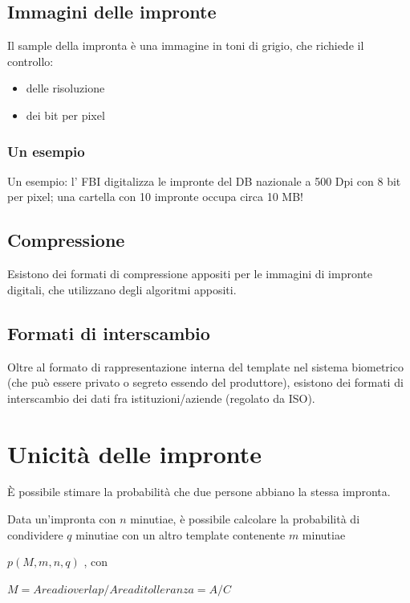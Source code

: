 \documentclass{report}
\begin{document}
\subsection{Immagini delle impronte}
Il sample della impronta è una immagine in toni
di grigio, che richiede il controllo:
\begin{itemize}
    \item delle risoluzione 
    \item dei bit per pixel
\end{itemize}

\subsubsection{Un esempio}
Un esempio: l’ FBI digitalizza le impronte del DB
nazionale a 500 Dpi con 8 bit per pixel; una
cartella con 10 impronte occupa circa 10 MB!

\subsection{Compressione}

Esistono dei formati di compressione appositi per le
immagini di impronte digitali, che utilizzano degli algoritmi appositi.


\subsection{Formati di interscambio}
Oltre al formato di rappresentazione interna del template
nel sistema biometrico (che può essere privato o segreto
essendo del produttore), esistono dei formati di
interscambio dei dati fra istituzioni/aziende (regolato da ISO).




\section{Unicità delle impronte}

È possibile stimare la probabilità che due persone abbiano la stessa impronta.

\noindent Data un'impronta con $n$ minutiae, è possibile calcolare la probabilità di
condividere $q$ minutiae con un altro template contenente $m$ minutiae

$p(M, m, n, q)$ , con

$M= Area di overlap / Area di tolleranza = A/C$
\end{document}
